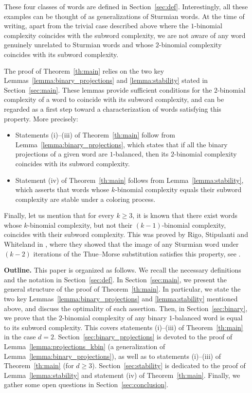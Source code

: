 \documentclass{template_arxiv}
\theoremstyle{definition}
\begin{document}
These four classes of words are defined in Section~\ref{sec:def}. Interestingly, all these examples can be thought of as generalizations of Sturmian words. At the time of writing, apart from the trivial case described above where the $1$-binomial complexity coincides with the subword complexity, we are not aware of any word genuinely unrelated to Sturmian words and whose $2$-binomial complexity coincides with its subword complexity.

\medskip

The proof of Theorem~\ref{th:main} relies on the two key Lemmas~\ref{lemma:binary_projections} and \ref{lemma:stability} stated in Section~\ref{sec:main}. These lemmas provide sufficient conditions for the $2$-binomial complexity of a word to coincide with its subword complexity, and can be regarded as a first step toward a characterization of words satisfying this property. More precisely:
\begin{itemize}
    \item[-] Statements (i)--(iii) of Theorem~\ref{th:main} follow from Lemma~\ref{lemma:binary_projections}, which states that if all the binary projections of a given word are $1$-balanced, then its $2$-binomial complexity coincides with its subword complexity.
    \item[-] Statement (iv) of Theorem~\ref{th:main} follows from Lemma~\ref{lemma:stability}, which asserts that words whose $k$-binomial complexity equals their subword complexity are stable under a coloring process.
\end{itemize}

Finally, let us mention that for every $k\geq 3$, it is known that there exist words whose $k$-binomial complexity, but not their $(k-1)$-binomial complexity, coincides with their subword complexity. This was proved by Rigo, Stipulanti and Whiteland in \cite{RSW24}, where they showed that the image of any Sturmian word under $(k-2)$ iterations of the Thue--Morse substitution satisfies this property, see \cite[Theorems~7.2 and 7.4]{RSW24}.

\medskip

\noindent\textbf{Outline.} This paper is organized as follows. We recall the necessary definitions and the notation in Section~\ref{sec:def}. In Section~\ref{sec:main}, we present the general structure of the proof of Theorem~\ref{th:main}. In particular, we state the two key Lemmas~\ref{lemma:binary_projections} and \ref{lemma:stability} mentioned above, and discuss the optimality of each assertion. Then, in Section~\ref{sec:binary}, we prove that the $2$-binomial complexity of any binary $1$-balanced word is equal to its subword complexity. This covers statements (i)--(iii) of Theorem~\ref{th:main} in the case $d=2$. Section~\ref{sec:binary_projections} is devoted to the proof of Lemma~\ref{lemma:projections_kbin} (a generalization of Lemma~\ref{lemma:binary_projections}), as well as to statements (i)--(iii) of Theorem~\ref{th:main} (for $d\geq 3$). Section~\ref{sec:stability} is dedicated to the proof of Lemma~\ref{lemma:stability} and statement (iv) of Theorem~\ref{th:main}. Finally, we gather some open questions in Section~\ref{sec:conclusion}.
\end{document}
